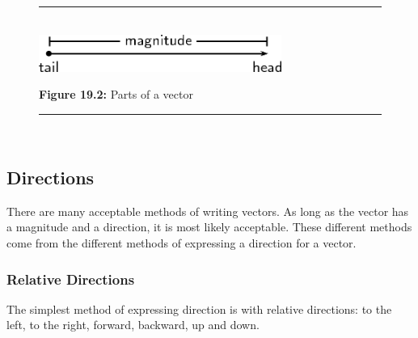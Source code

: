	\begin{figure}[H] %
    \begin{center}
    \rule[.1in]{\figurerulewidth}{.005in} \\
        \label{m38812*uid4!!!underscore!!!media}\label{m38812*uid4!!!underscore!!!printimage}\includegraphics[width=300px]{col11305.imgs/m38812_PG11C1_002.png} %
        
      \vspace{2pt}
    \vspace{\rubberspace}\par \begin{cnxcaption}
	  \small \textbf{Figure 19.2: }Parts of a vector
	\end{cnxcaption}
      
    \vspace{.1in}
    \rule[.1in]{\figurerulewidth}{.005in} \\
        
    \end{center}

 \end{figure}   

    \addtocounter{footnote}{-0}
    
      
    
    \label{m38812*cid5}
            \subsection{ Directions}
            \nopagebreak
            
      
      \label{m38812*id187219}There are many acceptable methods of writing vectors. As long as the vector has a magnitude and a direction, it is most likely acceptable. These different methods come from the different methods of expressing a direction for a vector.\par 
      \label{m38812*uid5}
            \subsubsection{ Relative Directions}
            \nopagebreak
            
        
        \label{m38812*id187233}The simplest method of expressing direction is with relative directions: to the left, to the right, forward, backward, up and down.\par 
      

